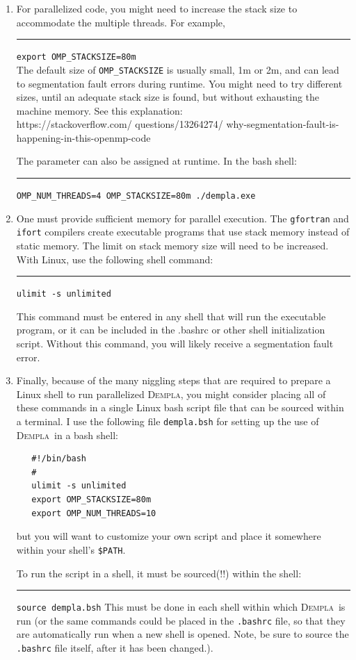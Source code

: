 \documentclass[letterpaper,11pt]{article}
\newcommand{\Dempla}{\textsc{Dempla}}
\begin{document}
\begin{enumerate}
be run in the bash shell:\\
\rule{3ex}{0ex}\texttt{OMP\_NUM\_THREADS=4 ./dempla.exe}\\
when 4 threads are desired.
\item
For parallelized code, you might need to increase the stack
size to accommodate the multiple threads.  For example,\\
\rule{3ex}{0ex}\texttt{export OMP\_STACKSIZE=80m}\\
The default size of \texttt{OMP\_STACKSIZE}
is usually small, 1m or 2m, and can lead
to segmentation fault errors during runtime.
You might need
to try different sizes, until an adequate stack size is found,
but without exhausting the machine memory.
See this explanation:\\
https://stackoverflow.com/
questions/13264274/
why-segmentation-fault-is-happening-in-this-openmp-code
\par
The parameter can also be assigned at runtime.
In the bash shell:\\
\rule{3ex}{0ex}\texttt{OMP\_NUM\_THREADS=4 OMP\_STACKSIZE=80m ./dempla.exe}
%
\item
One must provide sufficient memory for parallel execution.
The \texttt{gfortran} and \texttt{ifort}
compilers create executable programs
that use stack memory instead of static memory.
The limit on stack memory size will need to be increased.
With Linux,
use the following shell command:\\
\rule{3ex}{0ex}\texttt{ulimit -s unlimited}
\par
This command must be entered in any shell that will run the
executable program, or it can be included in the .bashrc or other
shell initialization script.  Without this command, you will
likely receive a segmentation fault error.
%
\item
Finally, because of the many niggling steps that
are required to prepare a Linux shell to run parallelized
\Dempla, you might consider placing all of these
commands in a single Linux bash script file that can
be sourced within a terminal.
I use the following file \texttt{dempla.bsh} for setting up
the use of \Dempla\ in a bash shell:
\begin{verbatim}
   #!/bin/bash
   #
   ulimit -s unlimited
   export OMP_STACKSIZE=80m
   export OMP_NUM_THREADS=10
\end{verbatim}
but you will want to customize your own script and place it
somewhere within your shell's \texttt{\$PATH}.
\par
To run the script in a shell,
it must be sourced(!!) within the shell:\\
\rule{3ex}{0ex}\texttt{source dempla.bsh}
This must be done in each shell within which \Dempla\ is run
(or the same commands could be placed in the \texttt{.bashrc}
file, so that they are automatically run when a new shell is
opened.  
Note, be sure to source the \texttt{.bashrc} file itself, after
it has been changed.).
%
\end{enumerate}
%
\end{document}
